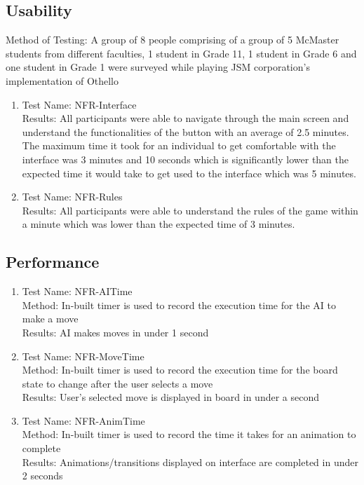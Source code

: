 \documentclass[12pt, titlepage]{article}
\begin{document}
\subsection{Usability}
Method of Testing: A group of 8 people comprising of a group of 5 McMaster students from different faculties, 1 student in Grade 11, 1 student in Grade 6 and one student in Grade 1 were surveyed while playing JSM corporation's implementation of Othello
\begin{enumerate}
	\item Test Name: NFR-Interface\\
	      Results: All participants were able to navigate through the main screen and understand the functionalities of the button with an average of 2.5 minutes. The maximum time it took for an individual to get comfortable with the interface was 3 minutes and 10 seconds which is significantly lower than the expected time it would take to get used to the interface which was 5 minutes.
	\item Test Name: NFR-Rules\\
	      Results: All participants were able to understand the rules of the game within a minute which was lower than the expected time of 3 minutes.
\end{enumerate}

\subsection{Performance}
\begin{enumerate}
	\item Test Name: NFR-AITime\\
	      Method: In-built timer is used to record the execution time for the AI to make a move\\
	      Results: AI makes moves in under 1 second
	\item Test Name: NFR-MoveTime\\
	      Method: In-built timer is used to record the execution time for the board state to change after the user selects a move\\
	      Results: User's selected move is displayed in board in under a second
	\item Test Name: NFR-AnimTime\\
	      Method: In-built timer is used to record the time it takes for an animation to complete\\
	      Results: Animations/transitions displayed on interface are completed in under 2 seconds
\end{enumerate}
\end{document}

